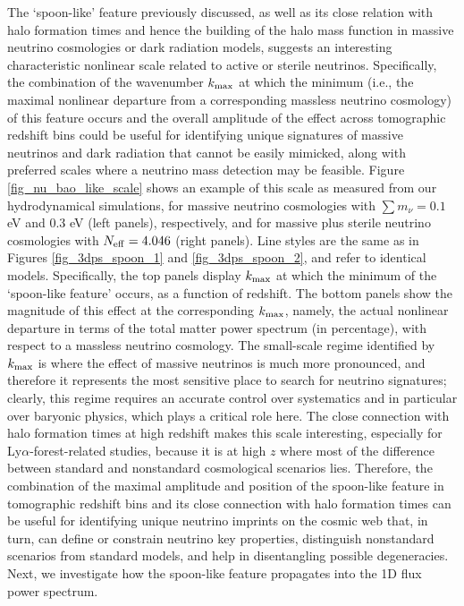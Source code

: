 \documentclass{emulateapj}
\begin{document}
The `spoon-like' feature previously discussed, as well as its close relation with halo formation times and hence the building of the halo mass function in massive neutrino cosmologies or dark radiation models,
suggests an interesting characteristic nonlinear  scale related to active or sterile neutrinos. Specifically, the combination of the wavenumber $k_{\rm max}$ 
at which the minimum (i.e., the maximal nonlinear departure from a corresponding massless neutrino cosmology) of this feature occurs  and the overall amplitude of the effect across tomographic
redshift bins  could be useful for identifying unique signatures of massive neutrinos and dark radiation that cannot be easily mimicked, along with 
 preferred scales where a 
neutrino mass detection may be feasible. 
Figure \ref{fig_nu_bao_like_scale} shows an example of this scale as measured from our hydrodynamical simulations, for massive neutrino cosmologies with $\sum m_{\nu}=0.1$ eV and 0.3 eV (left panels), respectively,
and for massive plus sterile neutrino cosmologies with $N_{\rm eff}=4.046$ (right panels). Line styles are the same as in Figures \ref{fig_3dps_spoon_1} and \ref{fig_3dps_spoon_2}, and refer to identical models.  
Specifically, the top panels display  $k_{\rm max}$ at which the minimum of the `spoon-like feature' occurs, as a function of redshift. The bottom panels show the  
magnitude of this effect at the corresponding $k_{\rm max}$, namely, the actual nonlinear departure in terms of the total matter power spectrum (in percentage), with respect to a massless neutrino cosmology.
The small-scale regime identified by $k_{\rm max}$ is where the effect of massive neutrinos is much more pronounced, and therefore it
represents the most sensitive place to search for neutrino signatures; clearly, this regime requires an accurate control over systematics and in particular over baryonic physics, which  plays a critical role here.  
The close connection with halo formation times at high redshift makes this scale interesting, especially for Ly$\alpha$-forest-related studies, 
because it is at high $z$ where most of the difference between standard and nonstandard  cosmological scenarios lies. 
Therefore, the combination of the maximal amplitude and position of the spoon-like feature in tomographic redshift bins and its close connection with halo formation times
can be useful for identifying unique neutrino imprints on the cosmic web that, in turn, can define or constrain neutrino key properties, distinguish nonstandard scenarios from standard models, 
and help in disentangling possible degeneracies. 
Next, we  investigate how the spoon-like feature propagates into the 1D flux power spectrum. 
\end{document}
